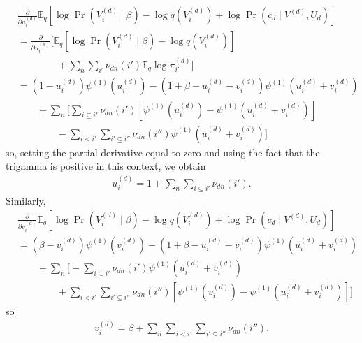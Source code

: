 \documentclass{article}
\newcommand{\trigamma}[1]{\ensuremath{\psi^{(1)}\left(#1\right)}}
\newcommand{\Eq}{\ensuremath{\mathbb{E}_q\xspace}}
\newcommand{\leftsibling}{\ensuremath{<}}
\newcommand{\ancestoreq}{\ensuremath{\subseteq}}
\newcommand{\pd}[1]{\ensuremath{\frac{\partial}{\partial #1}}}
\begin{document}
\begin{align*}
    &\pd{u_{i}^{(d)}} \Eq \left[ \log \Pr(V_i^{(d)} \mid \beta) - \log q(V_i^{(d)}) + \log \Pr(c_d \mid V^{(d)}, U_d) \right] \\
    &= \pd{u_{i}^{(d)}} \Bigg[ \Eq \left[ \log \Pr(V_i^{(d)} \mid \beta) - \log q(V_i^{(d)}) \right] \\
    &\qquad\qquad + \sum_n \sum_{i'} \nu_{dn}(i') \Eq \log \pi_{i'}^{(d)} \Bigg] \\
    &= (1 - u^{(d)}_i) \trigamma{u^{(d)}_i} - (1 + \beta - u^{(d)}_i - v^{(d)}_i) \trigamma{u^{(d)}_i + v^{(d)}_i} \\
    &\qquad + \sum_n \Bigg[ \sum_{i \ancestoreq i'} \nu_{dn}(i') \left[ \trigamma{u^{(d)}_i} - \trigamma{u^{(d)}_i + v^{(d)}_i} \right] \\
    &\qquad\qquad - \sum_{i \leftsibling i'} \sum_{i' \ancestoreq i''} \nu_{dn}(i'') \trigamma{u^{(d)}_i + v^{(d)}_i} \Bigg]
\end{align*}
so, setting the partial derivative equal to zero and using the fact that the trigamma is positive in this context, we obtain
\begin{align*}
    \boxed{ u^{(d)}_i = 1 + \sum_n \sum_{i \ancestoreq i'} \nu_{dn}(i') }.
\end{align*}
Similarly,
\begin{align*}
    &\pd{v_{i}^{(d)}} \Eq \left[ \log \Pr(V_i^{(d)} \mid \beta) - \log q(V_i^{(d)}) + \log \Pr(c_d \mid V^{(d)}, U_d) \right] \\
    &= (\beta - v^{(d)}_i) \trigamma{v^{(d)}_i} - (1 + \beta - u^{(d)}_i - v^{(d)}_i) \trigamma{u^{(d)}_i + v^{(d)}_i} \\
    &\qquad + \sum_n \Bigg[ - \sum_{i \ancestoreq i'} \nu_{dn}(i') \trigamma{u^{(d)}_i + v^{(d)}_i} \\
    &\qquad\qquad + \sum_{i \leftsibling i'} \sum_{i' \ancestoreq i''} \nu_{dn}(i'') \left[ \trigamma{v^{(d)}_i} - \trigamma{u^{(d)}_i + v^{(d)}_i} \right] \Bigg]
\end{align*}
so
\begin{align*}
    \boxed{ v^{(d)}_i = \beta + \sum_n \sum_{i \leftsibling i'} \sum_{i' \ancestoreq i''} \nu_{dn}(i'') }.
\end{align*}
\end{document}

